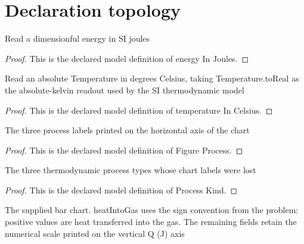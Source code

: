 \section{Declaration topology}
\begin{definition}
  \label{def:physics:phyx-mini-0346:phyxminiproblems-problemphyxmini0346-energyinjoules}
  Read a dimensionful energy in SI joules
\end{definition}
\begin{proof}
  This is the declared model definition of energy In Joules.
\end{proof}
\begin{definition}
  \label{def:physics:phyx-mini-0346:phyxminiproblems-problemphyxmini0346-temperatureincelsius}
  Read an absolute Temperature in degrees Celsius, taking Temperature.toReal as the absolute-kelvin readout used by the SI thermodynamic model
\end{definition}
\begin{proof}
  This is the declared model definition of temperature In Celsius.
\end{proof}
\begin{definition}
  \label{def:physics:phyx-mini-0346:phyxminiproblems-problemphyxmini0346-figureprocess}
  The three process labels printed on the horizontal axis of the chart
\end{definition}
\begin{proof}
  This is the declared model definition of Figure Process.
\end{proof}
\begin{definition}
  \label{def:physics:phyx-mini-0346:phyxminiproblems-problemphyxmini0346-processkind}
  The three thermodynamic process types whose chart labels were lost
\end{definition}
\begin{proof}
  This is the declared model definition of Process Kind.
\end{proof}
\begin{definition}
  \label{def:physics:phyx-mini-0346:phyxminiproblems-problemphyxmini0346-heatflowbarchart}
  The supplied bar chart. heatIntoGas uses the sign convention from the problem: positive values are heat transferred into the gas. The remaining fields retain the numerical scale printed on the vertical Q (J) axis
\end{definition}
